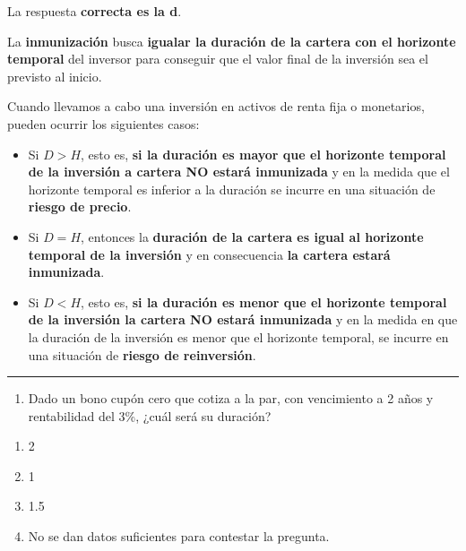 \documentclass[
  letterpaper,
  DIV=11,
  numbers=noendperiod]{scrreprt}
\providecommand{\tightlist}{%
  \setlength{\itemsep}{0pt}\setlength{\parskip}{0pt}}\usepackage{longtable,booktabs,array}
\begin{document}
\begin{tcolorbox}
\begin{tcolorbox}[enhanced jigsaw, toprule=.15mm, left=2mm, arc=.35mm, breakable, bottomrule=.15mm, opacityback=0, rightrule=.15mm, leftrule=.75mm, colframe=quarto-callout-note-color-frame, colback=white]
\begin{minipage}[t]{\textwidth - 5.5mm}
La respuesta \textbf{correcta es la d}.

La \textbf{inmunización} busca \textbf{igualar la duración de la cartera
con el horizonte temporal} del inversor para conseguir que el valor
final de la inversión sea el previsto al inicio.


Cuando llevamos a cabo una inversión en activos de renta fija o
monetarios, pueden ocurrir los siguientes casos:

\begin{itemize}
\item
  Si \(D > H\), esto es, \textbf{si la duración es mayor que el
  horizonte temporal de la inversión a cartera NO estará inmunizada} y
  en la medida que el horizonte temporal es inferior a la duración se
  incurre en una situación de \textbf{riesgo de precio}.
\item
  Si \(D = H\), entonces la \textbf{duración de la cartera es igual al
  horizonte temporal de la inversión} y en consecuencia \textbf{la
  cartera estará inmunizada}.
\item
  Si \(D < H\), esto es, \textbf{si la duración es menor que el
  horizonte temporal de la inversión la cartera NO estará inmunizada} y
  en la medida en que la duración de la inversión es menor que el
  horizonte temporal, se incurre en una situación de \textbf{riesgo de
  reinversión}.
\end{itemize}


\end{minipage}%
\end{tcolorbox}

\begin{center}\rule{0.5\linewidth}{0.5pt}\end{center}

\begin{enumerate}
\def\labelenumi{\arabic{enumi}.}
\setcounter{enumi}{1}
\tightlist
\item
  Dado un bono cupón cero que cotiza a la par, con vencimiento a 2 años
  y rentabilidad del 3\%, ¿cuál será su duración?
\end{enumerate}

\begin{enumerate}
\def\labelenumi{\alph{enumi}.}
\item
  2
\item
  1
\item
  1.5
\item
  No se dan datos suficientes para contestar la pregunta.
\end{enumerate}


\end{tcolorbox}
\end{document}
